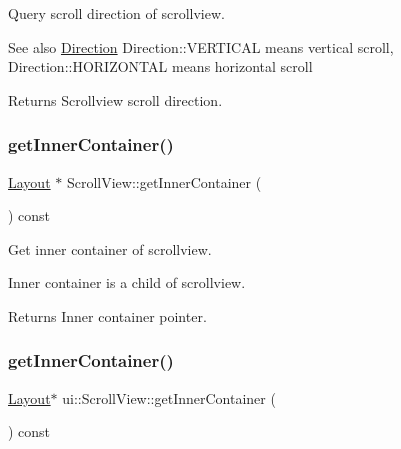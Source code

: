 Query scroll direction of scrollview.

\begin{DoxySeeAlso}{See also}
{\ttfamily \hyperlink{classui_1_1ScrollView_aed2d778ae8098dcafe323b2beae8dd6b}{Direction}} Direction\+::\+V\+E\+R\+T\+I\+C\+AL means vertical scroll, Direction\+::\+H\+O\+R\+I\+Z\+O\+N\+T\+AL means horizontal scroll
\end{DoxySeeAlso}
\begin{DoxyReturn}{Returns}
Scrollview scroll direction. 
\end{DoxyReturn}
\mbox{\label{classui_1_1ScrollView_aaca79776e46b13760419443226070efd}} 
\subsubsection{\texorpdfstring{get\+Inner\+Container()}{getInnerContainer()}\hspace{0.1cm}{\footnotesize\ttfamily [1/2]}}
{\footnotesize\ttfamily \hyperlink{classui_1_1Layout}{Layout} $\ast$ Scroll\+View\+::get\+Inner\+Container (\begin{DoxyParamCaption}{ }\end{DoxyParamCaption}) const}

Get inner container of scrollview.

Inner container is a child of scrollview.

\begin{DoxyReturn}{Returns}
Inner container pointer. 
\end{DoxyReturn}
\mbox{\label{classui_1_1ScrollView_a3f0cd25887319e2ea4b390b27f30dcb2}} 
\subsubsection{\texorpdfstring{get\+Inner\+Container()}{getInnerContainer()}\hspace{0.1cm}{\footnotesize\ttfamily [2/2]}}
{\footnotesize\ttfamily \hyperlink{classui_1_1Layout}{Layout}$\ast$ ui\+::\+Scroll\+View\+::get\+Inner\+Container (\begin{DoxyParamCaption}{ }\end{DoxyParamCaption}) const}

